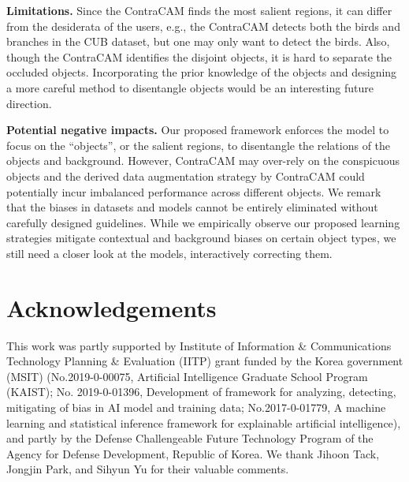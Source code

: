 \documentclass{article}
\begin{document}
\textbf{Limitations.}
Since the ContraCAM finds the most salient regions, it can differ from the desiderata of the users, e.g., the ContraCAM detects both the birds and branches in the CUB \citep{welinder2010caltech} dataset, but one may only want to detect the birds. Also, though the ContraCAM identifies the disjoint objects, it is hard to separate the occluded objects. Incorporating the prior knowledge of the objects and designing a more careful method to disentangle objects would be an interesting future direction.

\textbf{Potential negative impacts.}
Our proposed framework enforces the model to focus on the ``objects'', or the salient regions, to disentangle the relations of the objects and background. However, ContraCAM may over-rely on the conspicuous objects and the derived data augmentation strategy by ContraCAM could potentially incur imbalanced performance across different objects. We remark that the biases in datasets and models cannot be entirely eliminated without carefully designed guidelines. While we empirically observe our proposed learning strategies mitigate contextual and background biases on certain object types, we still need a closer look at the models, interactively correcting them.

\section*{Acknowledgements}
This work was partly supported by Institute of Information \& Communications Technology Planning \& Evaluation (IITP) grant funded by the Korea government (MSIT) (No.2019-0-00075, Artificial Intelligence Graduate School Program (KAIST); No. 2019-0-01396, Development of framework for analyzing, detecting, mitigating of bias in AI model and training data; No.2017-0-01779, A machine learning and statistical inference framework for explainable artificial intelligence), and partly by the Defense Challengeable Future Technology Program of the Agency for Defense Development, Republic of Korea. We thank Jihoon Tack, Jongjin Park, and Sihyun Yu for their valuable comments.


{\small

}

% 

\newpage
\appendix



\newpage


\newpage


\newpage


\newpage

\end{document}
